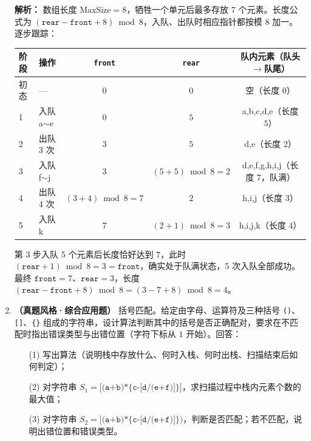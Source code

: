 \begin{enumerate}[resume]
\ifshowsolutions\par\noindent\textbf{解析：} 数组长度 $\text{MaxSize}=8$，牺牲一个单元后最多存放 $7$ 个元素。长度公式为 $(\texttt{rear}-\texttt{front}+8)\bmod 8$，入队、出队时相应指针都按模 $8$ 加一。逐步跟踪：
\begin{center}
\begin{tabular}{llccc}
\toprule
阶段 & 操作 & \texttt{front} & \texttt{rear} & 队内元素（队头$\to$队尾） \\
\midrule
初态 & — & $0$ & $0$ & 空（长度 $0$） \\
1 & 入队 a$\sim$e & $0$ & $5$ & a,b,c,d,e（长度 $5$） \\
2 & 出队 3 次 & $3$ & $5$ & d,e（长度 $2$） \\
3 & 入队 f$\sim$j & $3$ & $(5+5)\bmod 8=2$ & d,e,f,g,h,i,j（长度 $7$，队满） \\
4 & 出队 4 次 & $(3+4)\bmod 8=7$ & $2$ & h,i,j（长度 $3$） \\
5 & 入队 k & $7$ & $(2+1)\bmod 8=3$ & h,i,j,k（长度 $4$） \\
\bottomrule
\end{tabular}
\end{center}
第 3 步入队 5 个元素后长度恰好达到 $7$，此时 $(\texttt{rear}+1)\bmod 8=3=\texttt{front}$，确实处于队满状态，5 次入队全部成功。最终 $\texttt{front}=7$、$\texttt{rear}=3$，长度 $(\texttt{rear}-\texttt{front}+8)\bmod 8=(3-7+8)\bmod 8=4$。
\par\noindent{}\else \answerarea[8] \fi

\item \textbf{（真题风格·综合应用题）} 括号匹配。给定由字母、运算符及三种括号 \texttt{()}、\texttt{[]}、\texttt{\{\}} 组成的字符串，设计算法判断其中的括号是否正确配对，要求在不匹配时指出错误类型与出错位置（字符下标从 $1$ 开始）。回答：
\begin{enumerate}
\item[(1)] 写出算法（说明栈中存放什么、何时入栈、何时出栈、扫描结束后如何判定）；
\item[(2)] 对字符串 $S_1=\texttt{[(a+b)*\{c-[d/(e+f)]\}]}$，求扫描过程中栈内元素个数的最大值；
\item[(3)] 对字符串 $S_2=\texttt{[(a+b)*\{c-[d/(e+f)]\})}$，判断是否匹配；若不匹配，说明出错位置和错误类型。
\end{enumerate}


\end{enumerate}
